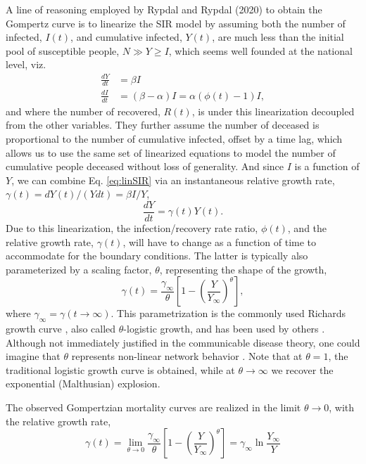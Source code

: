 \documentclass{article}
\begin{document}
A line of reasoning employed by Rypdal and Rypdal (2020) \cite{Rypdal2020} to obtain the Gompertz curve is to linearize the SIR model by assuming
both the number of infected, $I(t)$, and cumulative infected, $Y(t)$, are much less than the initial pool of susceptible people, $N \gg Y \ge I$, which seems well founded at the national level, viz.
\begin{align}
\label{eq:linSIR}
\frac{dY}{dt}& = \beta I\\
\frac{dI}{dt}& = (\beta - \alpha) I = \alpha (\phi(t) - 1) I,
\end{align}
and where the number of recovered, $R(t)$, is under this linearization decoupled from the other variables. They further assume the number of deceased is proportional to the number of cumulative infected, offset by a time lag, which allows us to use the same set of linearized equations to model the number of cumulative people deceased without loss of generality. And since $I$ is a function of $Y$, we can combine Eq. \ref{eq:linSIR} via an instantaneous relative growth rate, $\gamma(t) = dY(t) /(Ydt) = \beta I / Y$, 
\begin{equation}
\frac{dY}{dt} = \gamma(t) Y(t) \label{eq:rypdalODE}.
\end{equation}
Due to this linearization, the infection/recovery rate ratio, $\phi(t)$, and the relative growth rate, $\gamma(t)$, will have to change as a function of time to accommodate for the boundary conditions. The latter is typically also parameterized by a scaling factor, $\theta$, representing the shape of the growth,
\begin{equation}
\label{eq:rypdalGamma}
\gamma(t) = \frac{\gamma_{\infty}}{\theta}\left[1 - \left(\frac{Y}{Y_{\infty}}\right)^{\theta} \right] ,
\end{equation}
where $\gamma_{\infty} = \gamma(t\rightarrow \infty)$. This parametrization is the commonly used Richards growth curve \cite{richards1959flexible}, also called $\theta$-logistic growth, and has been used by others \cite{wu2020generalized}. Although not immediately justified in the communicable disease theory, one could imagine that $\theta$ represents non-linear network behavior \cite{petroni2020logistic}. Note that at $\theta=1$, the traditional logistic growth curve is obtained, while at $\theta\rightarrow \infty$ we recover the exponential (Malthusian) explosion.

The observed Gompertzian mortality curves are realized in the limit $\theta \rightarrow 0$, with the relative growth rate, 
\begin{equation}
\label{eq:rypdalLimit}
\gamma(t) = \lim_{\theta \rightarrow 0}\frac{\gamma_{\infty}}{\theta}\left[1 - \left(\frac{Y}{Y_{\infty}}\right)^{\theta} \right]
= \gamma_{\infty}\ln{\frac{Y_{\infty}}{Y}}
\end{equation}
\end{document}
